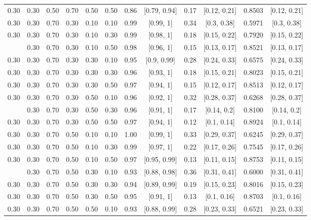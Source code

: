 \documentclass[
  11pt,
]{article}
\begin{document}
\begin{landscape}
\begin{ThreePartTable}
\begin{longtable}[t]{cccccccccccc}
0.30 & 0.30 & 0.50 & 0.70 & 0.50 & 0.50 & 0.86 & {}[0.79, 0.94] & 0.17 & {}[0.12, 0.21] & 0.8503 & {}[0.12, 0.21]\\
0.30 & 0.30 & 0.70 & 0.30 & 0.10 & 0.10 & 0.99 & {}[0.99, 1] & 0.34 & {}[0.3, 0.38] & 0.5971 & {}[0.3, 0.38]\\
0.30 & 0.30 & 0.70 & 0.30 & 0.10 & 0.30 & 0.99 & {}[0.98, 1] & 0.18 & {}[0.15, 0.22] & 0.7920 & {}[0.15, 0.22]\\
\addlinespace
0.30 & 0.30 & 0.70 & 0.30 & 0.10 & 0.50 & 0.98 & {}[0.96, 1] & 0.15 & {}[0.13, 0.17] & 0.8521 & {}[0.13, 0.17]\\
0.30 & 0.30 & 0.70 & 0.30 & 0.30 & 0.10 & 0.95 & {}[0.9, 0.99] & 0.28 & {}[0.24, 0.33] & 0.6575 & {}[0.24, 0.33]\\
0.30 & 0.30 & 0.70 & 0.30 & 0.30 & 0.30 & 0.96 & {}[0.93, 1] & 0.18 & {}[0.15, 0.21] & 0.8023 & {}[0.15, 0.21]\\
0.30 & 0.30 & 0.70 & 0.30 & 0.30 & 0.50 & 0.97 & {}[0.94, 1] & 0.15 & {}[0.12, 0.17] & 0.8513 & {}[0.12, 0.17]\\
0.30 & 0.30 & 0.70 & 0.30 & 0.50 & 0.10 & 0.96 & {}[0.92, 1] & 0.32 & {}[0.28, 0.37] & 0.6268 & {}[0.28, 0.37]\\
\addlinespace
0.30 & 0.30 & 0.70 & 0.30 & 0.50 & 0.30 & 0.96 & {}[0.91, 1] & 0.17 & {}[0.14, 0.2] & 0.8100 & {}[0.14, 0.2]\\
0.30 & 0.30 & 0.70 & 0.30 & 0.50 & 0.50 & 0.97 & {}[0.94, 1] & 0.12 & {}[0.1, 0.14] & 0.8924 & {}[0.1, 0.14]\\
0.30 & 0.30 & 0.70 & 0.50 & 0.10 & 0.10 & 1.00 & {}[0.99, 1] & 0.33 & {}[0.29, 0.37] & 0.6245 & {}[0.29, 0.37]\\
0.30 & 0.30 & 0.70 & 0.50 & 0.10 & 0.30 & 0.99 & {}[0.97, 1] & 0.22 & {}[0.17, 0.26] & 0.7545 & {}[0.17, 0.26]\\
0.30 & 0.30 & 0.70 & 0.50 & 0.10 & 0.50 & 0.97 & {}[0.95, 0.99] & 0.13 & {}[0.11, 0.15] & 0.8753 & {}[0.11, 0.15]\\
\addlinespace
0.30 & 0.30 & 0.70 & 0.50 & 0.30 & 0.10 & 0.93 & {}[0.88, 0.98] & 0.36 & {}[0.31, 0.41] & 0.6000 & {}[0.31, 0.41]\\
0.30 & 0.30 & 0.70 & 0.50 & 0.30 & 0.30 & 0.94 & {}[0.89, 0.99] & 0.19 & {}[0.15, 0.23] & 0.8016 & {}[0.15, 0.23]\\
0.30 & 0.30 & 0.70 & 0.50 & 0.30 & 0.50 & 0.95 & {}[0.91, 1] & 0.13 & {}[0.1, 0.16] & 0.8703 & {}[0.1, 0.16]\\
0.30 & 0.30 & 0.70 & 0.50 & 0.50 & 0.10 & 0.93 & {}[0.88, 0.99] & 0.28 & {}[0.23, 0.33] & 0.6521 & {}[0.23, 0.33]\\

\end{longtable}
\end{ThreePartTable}
\end{landscape}
\end{document}
